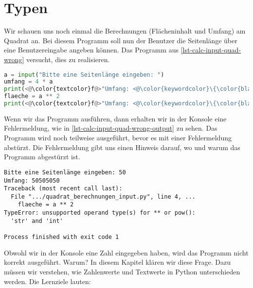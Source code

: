 
\toggletrue{image}
\toggletrue{imagehover}

\chapter{Typen}
\label{chapter-typen}

Wir schauen uns noch einmal die Berechnungen (Flächeninhalt und Umfang) am Quadrat an. Bei diesem Programm soll nun der Benutzer die Seitenlänge über eine Benutzereingabe angeben können. Das Programm aus \autoref{lst-calc-input-quad-wrong} versucht, dies zu realisieren.

\begin{lstlisting}[language=python, caption={Geometrische Berechnungen am Quadrat.}, label=lst-calc-input-quad-wrong]
a = input("Bitte eine Seitenlänge eingeben: ")
umfang = 4 * a
print(<@\color{textcolor}f@>"Umfang: <@\color{keywordcolor}\{\color{black}umfang\color{keywordcolor}\}@>")
flaeche = a ** 2
print(<@\color{textcolor}f@>"Umfang: <@\color{keywordcolor}\{\color{black}flaeche\color{keywordcolor}\}@>")
\end{lstlisting}

Wenn wir das Programm ausführen, dann erhalten wir in der Konsole eine Fehlermeldung, wie in \autoref{lst-calc-input-quad-wrong-output} zu sehen. Das Programm wird noch teilweise ausgeführt, bevor es mit einer Fehlermeldung abstürzt. Die Fehlermeldung gibt uns einen Hinweis darauf, wo und warum das Programm abgestürzt ist.

\begin{lstlisting}[language=output, label={lst-calc-input-quad-wrong-output}, caption={Konsolenausgabe des fehlerhaften Programms.}]
Bitte eine Seitenlänge eingeben: 50
Umfang: 50505050
Traceback (most recent call last):
  File ".../quadrat_berechnungen_input.py", line 4, ...
    flaeche = a ** 2
TypeError: unsupported operand type(s) for ** or pow(): 
  'str' and 'int'

Process finished with exit code 1
\end{lstlisting}

Obwohl wir in der Konsole eine Zahl eingegeben haben, wird das Programm nicht korrekt ausgeführt. Warum? In diesem Kapitel klären wir diese Frage. Dazu müssen wir verstehen, wie Zahlenwerte und Textwerte in Python unterschieden werden. Die Lernziele lauten:

